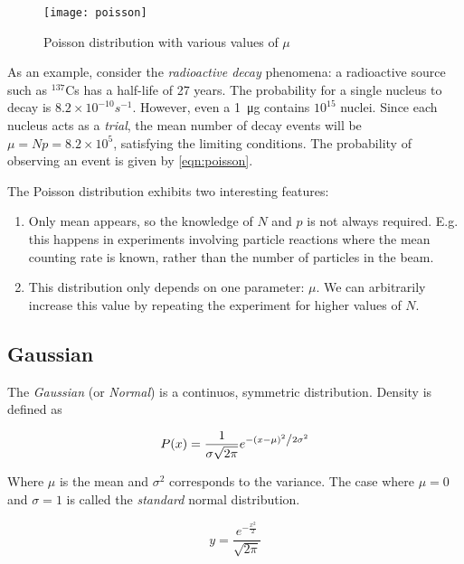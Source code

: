 \begin{figure}
	\centerline{
		\texttt{[image: poisson]}}
	\caption{Poisson distribution with various values of $\mu$ \cite{leo2012techniques}}
\end{figure}

As an example, consider the \textit{radioactive decay} phenomena: a radioactive source such as $^{137}$Cs has a half-life of 27 years. The probability for a single nucleus to decay is $8.2 \times 10^{-10}s^{-1}$. However, even a \SI{1}{\micro\gram} contains $10^{15}$ nuclei. Since each nucleus acts as a \textit{trial}, the mean number of decay events will be $\mu = N p = 8.2 \times 10^5$, satisfying the limiting conditions. The probability of observing an event is given by \ref{eqn:poisson}.

The Poisson distribution exhibits two interesting features:

\begin{enumerate}
	\item Only mean appears, so the knowledge of $N$ and $p$ is not always required. E.g. this happens in experiments involving particle reactions where the mean counting rate is known, rather than the number of particles in the beam.

	\item This distribution only depends on one parameter: $\mu$. We can arbitrarily increase this value by repeating the experiment for higher values of $N$.
\end{enumerate}

\subsection{Gaussian}
\label{eqn:gaussian}

The \textit{Gaussian} (or \textit{Normal}) is a continuos, symmetric distribution. Density is defined as

\begin{equation}
	P(x) = \frac{1}{{\sigma \sqrt {2\pi } }}e^{{{ - \left( {x - \mu } \right)^2 } \mathord{\left/ {\vphantom {{ - \left( {x - \mu } \right)^2 } {2\sigma ^2 }}} \right. \kern-\nulldelimiterspace} {2\sigma ^2 }}}
\end{equation}

Where $\mu$ is the mean and $\sigma ^2$ corresponds to the variance. The case where $\mu = 0$ and $\sigma = 1$ is called the \textit{standard} normal distribution.

\begin{equation}
	y = \frac{e^{ - \frac{{x^2 }}{2}}}{{\sqrt {2\pi } }}
\end{equation}

